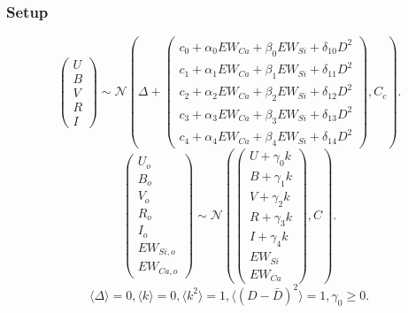 \documentclass[11pt, oneside]{article}   	%
\begin{document}
\subsubsection{Setup}
\begin{equation*}
\left(
\begin{matrix}
U\\B\\V\\R\\I
\end{matrix}
\right) \sim \mathcal{N}
\left(
\Delta +
\left(
\begin{matrix}
c_0+\alpha_0 EW_{Ca} + \beta_0 EW_{Si} +\delta_{10} D^2\\
c_1+\alpha_1 EW_{Ca} + \beta_1 EW_{Si} +\delta_{11} D^2\\
c_2+\alpha_2 EW_{Ca} + \beta_2 EW_{Si} +\delta_{12} D^2\\
c_3+\alpha_3 EW_{Ca} + \beta_3 EW_{Si} +\delta_{13} D^2\\
c_4+\alpha_4 EW_{Ca} + \beta_4 EW_{Si} +\delta_{14} D^2
\end{matrix}
\right)
,C_{c}
\right).
\end{equation*}
\begin{equation*}
\left(
\begin{matrix}
U_o  \\B_o\\ V_o\\R_o\\I_o\\EW_{Si, o}\\ EW_{Ca, o}
\end{matrix}
\right) \sim \mathcal{N}
\left(
\left(
\begin{matrix}
U +\gamma_0 k \\B +\gamma_1 k \\V+\gamma_2 k\\R+\gamma_3 k\\I+\gamma_4 k\\
EW_{Si}\\ EW_{Ca}
\end{matrix}
\right)
,C
\right).
\end{equation*}
\begin{equation*}
\langle \Delta \rangle=0, \langle k \rangle=0, \langle k^2 \rangle=1, \langle (D-\bar{D})^2 \rangle=1, \gamma_0 \ge 0.
\end{equation*}
\end{document}
